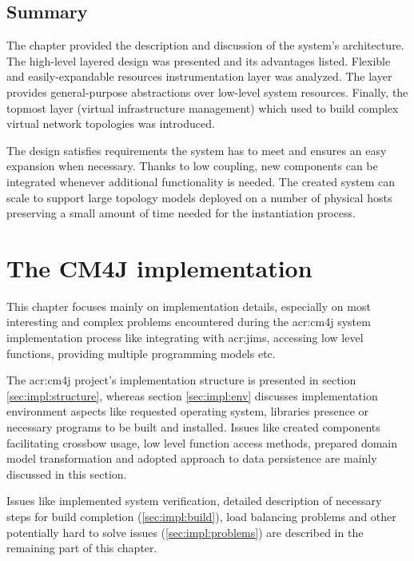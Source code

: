 \documentclass[11pt,openany]{book}
\begin{document}
    \section*{Summary}

      The chapter provided the description and discussion of the system's architecture. The high-level layered design
      was presented and its advantages listed. Flexible and easily-expandable resources instrumentation layer was
      analyzed. The layer provides general-purpose abstractions over low-level system resources.  Finally, the topmost
      layer (virtual infrastructure management) which used to build complex virtual network topologies was introduced.

      The design satisfies requirements the system has to meet and ensures an easy expansion when necessary. Thanks to
      low coupling, new components can be integrated whenever additional functionality is needed. The created system can
      scale to support large topology models deployed on a number of physical hosts preserving a small amount of time
      needed for the instantiation process.


  \chapter{The CM4J implementation}
  \label{chap:impl}

    This chapter focuses mainly on implementation details, especially on most interesting and complex problems
    encountered during the \gls{acr:cm4j} system implementation process  like integrating with \gls{acr:jims}, accessing
    low level functions, providing multiple programming models etc.

    The \gls{acr:cm4j} project's implementation structure is presented in section \ref{sec:impl:structure}, whereas
    section \ref{sec:impl:env} discusses implementation environment aspects like requested operating system,
    libraries presence or necessary programs to be built and installed. Issues like created components facilitating
    crossbow usage, low level function access methods, prepared domain model
    transformation and adopted approach to data persistence are mainly
    discussed in this section.

    Issues like implemented system verification, detailed description of necessary steps for
    build completion (\ref{sec:impl:build}), load balancing problems and other potentially hard to solve issues
    (\ref{sec:impl:problems}) are described in the remaining part of this chapter.
\end{document}
